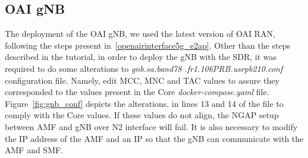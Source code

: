 \begin{table}[H]
    \caption{Deployed 5G Core Network Functions IP addresses.}
    \label{tab:ip_core}
    \centering
\end{table}

\begin{table}[H]
    \caption{Deployed Data Network Components IP addresses.}
    \label{tab:ip_dn}
    \centering
\end{table}






\subsection{OAI gNB}\label{subsec:oai-gnb}
The deployment of the OAI gNB, we used the latest version of OAI RAN, following the steps present in~\ref{openairinterface5g_e2ap}.
Other than the steps described in the tutorial, in order to deploy the gNB with the SDR, it was required to do some alterations to \textit{gnb.sa.band78
.fr1.106PRB.usrpb210.conf} configuration file.
Namely, edit MCC, MNC and TAC values to assure they corresponded to the values present in the Core \textit{docker-compose.yaml} file.
Figure~\ref{fig:gnb_conf} depicts the alterations, in lines 13 and 14 of the file to comply with the Core values.
If these values do not align, the NGAP setup between AMF and gNB over N2 interface will fail.
It is also necessary to modify the IP address of the AMF and an IP so that the gNB can communicate with the AMF and SMF\@.

